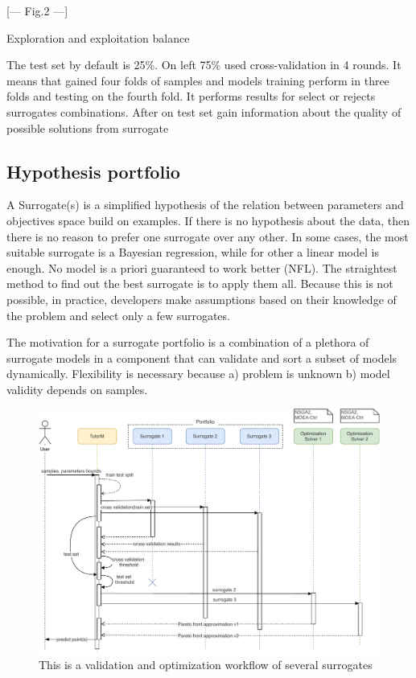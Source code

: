                     [---        Fig.2           ---]

    Exploration and exploitation balance    

    The test set by default is 25\%. On left 75\% used cross-validation in 4 rounds. It means that gained four folds of samples and models training perform in three folds and testing on the fourth fold. It performs results for select or rejects surrogates combinations. After on test set gain information about the quality of possible solutions from surrogate 




    \subsection{Hypothesis portfolio}
    A Surrogate(s) is a simplified hypothesis of the relation between parameters and objectives space build on examples. If there is no hypothesis about the data, then there is no reason to prefer one surrogate over any other.  In some cases, the most suitable surrogate is a Bayesian regression, while for other a linear model is enough. No model is a priori guaranteed to work better (NFL). The straightest method to find out the best surrogate is to apply them all. Because this is not possible, in practice, developers make assumptions based on their knowledge of the problem and select only a few surrogates. 

    The motivation for a surrogate portfolio is a combination of a plethora of surrogate models in a component that can validate and sort a subset of models dynamically. Flexibility is necessary because a) problem is unknown b) model validity depends on samples.

        \begin{figure}
            \centering
            \includegraphics[width=\textwidth]{content/images/portfolio_validation_solv}
            \caption[Portfolio validation activity]{This is a validation and optimization workflow of several surrogates}
            \label{fig:tutor_activity}
        \end{figure}

